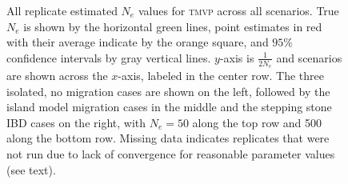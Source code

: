 \begin{landscape}
\begin{figure}[ht]
\centering
{}
\caption[All replicate estimated $N_e$ values for \textsc{tmvp} across all scenarios.]{All replicate estimated $N_e$ values for \textsc{tmvp} across all scenarios. True $N_e$ is shown by the horizontal green lines, point estimates in red with their average indicate by the orange square, and $95\%$ confidence intervals by gray vertical lines. $y$-axis is $\frac{1}{2 N_e}$ and scenarios are shown across the $x$-axis, labeled in the center row. The three isolated, no migration cases are shown on the left, followed by the island model migration cases in the middle and the stepping stone IBD cases on the right, with $N_e = 50$ along the top row and 500 along the bottom row. Missing data indicates replicates that were not run due to lack of convergence for reasonable parameter values (see text).}
\label{fig:supp_tmvp}
\end{figure}



\end{landscape}
